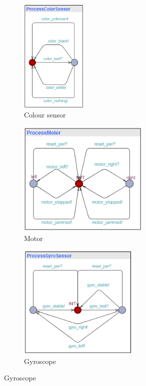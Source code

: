 \documentclass[a4paper,oneside,11pt]{article}
\begin{document}
\begin{figure}
\centering
\begin{subfigure}{0.1\textwidth}
\centering
\includegraphics[height=55mm]{processcolorsensor}
\caption{Colour sensor}
\end{subfigure}
\hfill
\begin{subfigure}{0.3\textwidth}
\centering
\includegraphics[height=55mm]{processmotor}
\caption{Motor}
\end{subfigure}
\hfill
\begin{subfigure}{0.3\textwidth}
\centering
\includegraphics[height=55mm]{processgyrosensor}
\caption{Gyroscope}
\end{subfigure}


\end{figure}
\end{document}
